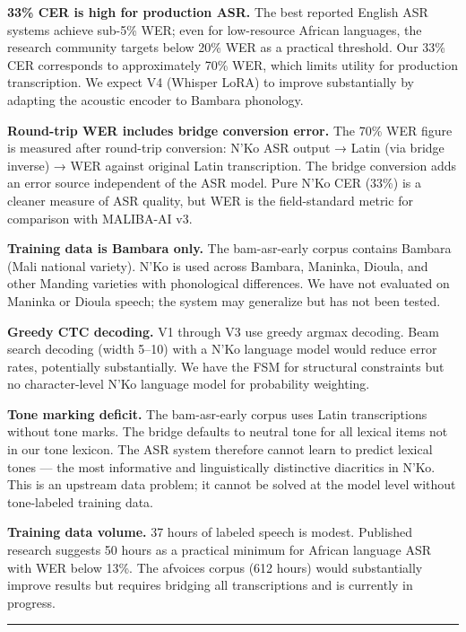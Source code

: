 \documentclass[
]{article}
\begin{document}
\textbf{33\% CER is high for production ASR.} The best reported English
ASR systems achieve sub-5\% WER; even for low-resource African
languages, the research community targets below 20\% WER as a practical
threshold. Our 33\% CER corresponds to approximately 70\% WER, which
limits utility for production transcription. We expect V4 (Whisper LoRA)
to improve substantially by adapting the acoustic encoder to Bambara
phonology.

\textbf{Round-trip WER includes bridge conversion error.} The 70\% WER
figure is measured after round-trip conversion: N'Ko ASR output → Latin
(via bridge inverse) → WER against original Latin transcription. The
bridge conversion adds an error source independent of the ASR model.
Pure N'Ko CER (33\%) is a cleaner measure of ASR quality, but WER is the
field-standard metric for comparison with MALIBA-AI v3.

\textbf{Training data is Bambara only.} The bam-asr-early corpus
contains Bambara (Mali national variety). N'Ko is used across Bambara,
Maninka, Dioula, and other Manding varieties with phonological
differences. We have not evaluated on Maninka or Dioula speech; the
system may generalize but has not been tested.

\textbf{Greedy CTC decoding.} V1 through V3 use greedy argmax decoding.
Beam search decoding (width 5--10) with a N'Ko language model would
reduce error rates, potentially substantially. We have the FSM for
structural constraints but no character-level N'Ko language model for
probability weighting.

\textbf{Tone marking deficit.} The bam-asr-early corpus uses Latin
transcriptions without tone marks. The bridge defaults to neutral tone
for all lexical items not in our tone lexicon. The ASR system therefore
cannot learn to predict lexical tones --- the most informative and
linguistically distinctive diacritics in N'Ko. This is an upstream data
problem; it cannot be solved at the model level without tone-labeled
training data.

\textbf{Training data volume.} 37 hours of labeled speech is modest.
Published research \cite{data_scaling_2024} suggests 50 hours as a
practical minimum for African language ASR with WER below 13\%. The
afvoices corpus (612 hours) would substantially improve results but
requires bridging all transcriptions and is currently in progress.

\begin{center}\rule{0.5\linewidth}{0.5pt}\end{center}
\end{document}
